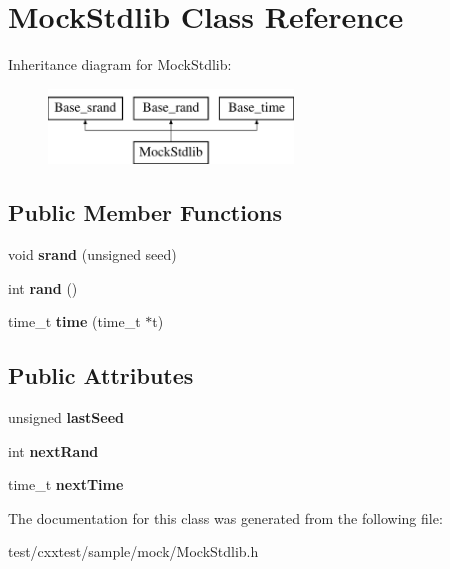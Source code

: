 \hypertarget{classMockStdlib}{\section{Mock\-Stdlib Class Reference}
\label{classMockStdlib}
}
Inheritance diagram for Mock\-Stdlib\-:\begin{figure}[H]
\begin{center}
\leavevmode
\includegraphics[height=2.000000cm]{classMockStdlib}
\end{center}
\end{figure}
\subsection*{Public Member Functions}
\begin{DoxyCompactItemize}
\item 
\hypertarget{classMockStdlib_a7dcf22d3b3e84c865d4b097518395237}{void {\bfseries srand} (unsigned seed)}\label{classMockStdlib_a7dcf22d3b3e84c865d4b097518395237}

\item 
\hypertarget{classMockStdlib_a7bfee01ccb4780deb104505357e5c0f8}{int {\bfseries rand} ()}\label{classMockStdlib_a7bfee01ccb4780deb104505357e5c0f8}

\item 
\hypertarget{classMockStdlib_a50a75e688d477c4c7a7b8a029473c665}{time\-\_\-t {\bfseries time} (time\-\_\-t $\ast$t)}\label{classMockStdlib_a50a75e688d477c4c7a7b8a029473c665}

\end{DoxyCompactItemize}
\subsection*{Public Attributes}
\begin{DoxyCompactItemize}
\item 
\hypertarget{classMockStdlib_a099dda4298f1666df48f7cb0dc11cc17}{unsigned {\bfseries last\-Seed}}\label{classMockStdlib_a099dda4298f1666df48f7cb0dc11cc17}

\item 
\hypertarget{classMockStdlib_af11adee0e8d9fa79cd972cd0abb3147e}{int {\bfseries next\-Rand}}\label{classMockStdlib_af11adee0e8d9fa79cd972cd0abb3147e}

\item 
\hypertarget{classMockStdlib_a61338d56a5f2cc3efd41a89d9d894abc}{time\-\_\-t {\bfseries next\-Time}}\label{classMockStdlib_a61338d56a5f2cc3efd41a89d9d894abc}

\end{DoxyCompactItemize}


The documentation for this class was generated from the following file\-:\begin{DoxyCompactItemize}
\item 
test/cxxtest/sample/mock/Mock\-Stdlib.\-h\end{DoxyCompactItemize}
